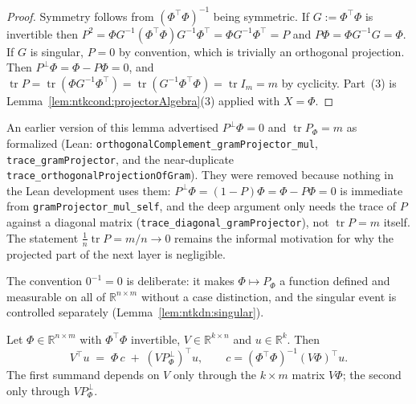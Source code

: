 \begin{proof}
  \leanok
Symmetry follows from $(\Phi^\top\Phi)^{-1}$ being symmetric. If $G:=\Phi^\top\Phi$ is invertible then $P^2=\Phi G^{-1}(\Phi^\top\Phi)G^{-1}\Phi^\top=\Phi G^{-1}\Phi^\top=P$ and $P\Phi=\Phi G^{-1}G=\Phi$. If $G$ is singular, $P=0$ by convention, which is trivially an orthogonal projection. Then $P^\perp\Phi=\Phi-P\Phi=0$, and $\operatorname{tr}P=\operatorname{tr}(\Phi G^{-1}\Phi^\top)=\operatorname{tr}(G^{-1}\Phi^\top\Phi)=\operatorname{tr}I_m=m$ by cyclicity. Part~(3) is Lemma~\ref{lem:ntkcond:projectorAlgebra}(3) applied with $X=\Phi$.
\end{proof}

\begin{remark}\label{rmk:ntkcond:gramProjectorChange}
An earlier version of this lemma advertised $P^\perp\Phi=0$ and $\operatorname{tr}P_\Phi=m$ as formalized (Lean: \texttt{orthogonalComplement\_gramProjector\_mul}, \texttt{trace\_gramProjector}, and the near-duplicate \texttt{trace\_orthogonalProjectionOfGram}). They were removed because nothing in the Lean development uses them: $P^\perp\Phi=(1-P)\Phi=\Phi-P\Phi=0$ is immediate from \texttt{gramProjector\_mul\_self}, and the deep argument only needs the trace of $P$ against a diagonal matrix (\texttt{trace\_diagonal\_gramProjector}), not $\operatorname{tr}P=m$ itself. The statement $\tfrac1n\operatorname{tr}P=m/n\to0$ remains the informal motivation for why the projected part of the next layer is negligible.
\end{remark}


The convention $0^{-1}=0$ is deliberate: it makes $\Phi\mapsto P_\Phi$ a function defined and measurable on all of $\mathbb R^{n\times m}$ without a case distinction, and the singular event is controlled separately (Lemma~\ref{lem:ntkdn:singular}).

\begin{theorem}\label{thm:ntkcond:backSplit}
  \leanok
Let $\Phi\in\mathbb R^{n\times m}$ with $\Phi^\top\Phi$ invertible, $V\in\mathbb R^{k\times n}$ and $u\in\mathbb R^k$. Then
\[
  V^\top u\;=\;\Phi\,c\;+\;(VP_\Phi^\perp)^\top u,\qquad c=(\Phi^\top\Phi)^{-1}(V\Phi)^\top u.
\]
The first summand depends on $V$ only through the $k\times m$ matrix $V\Phi$; the second only through $VP_\Phi^\perp$.
\end{theorem}

